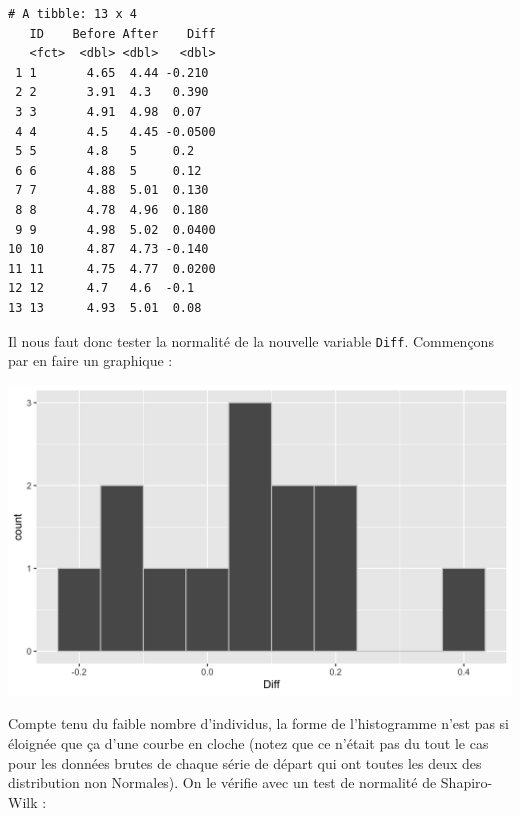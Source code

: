 \documentclass[a4paperpaper,]{article}
\newenvironment{Shaded}{\begin{snugshade}}{\end{snugshade}}
\newcommand{\DataTypeTok}[1]{\textcolor[rgb]{0.00,0.34,0.68}{#1}}
\newcommand{\DecValTok}[1]{\textcolor[rgb]{0.69,0.50,0.00}{#1}}
\newcommand{\FloatTok}[1]{\textcolor[rgb]{0.69,0.50,0.00}{#1}}
\newcommand{\KeywordTok}[1]{\textcolor[rgb]{0.12,0.11,0.11}{\textbf{#1}}}
\newcommand{\NormalTok}[1]{\textcolor[rgb]{0.12,0.11,0.11}{#1}}
\newcommand{\OperatorTok}[1]{\textcolor[rgb]{0.12,0.11,0.11}{#1}}
\newcommand{\StringTok}[1]{\textcolor[rgb]{0.75,0.01,0.01}{#1}}
\begin{document}
\begin{verbatim}
# A tibble: 13 x 4
   ID    Before After    Diff
   <fct>  <dbl> <dbl>   <dbl>
 1 1       4.65  4.44 -0.210 
 2 2       3.91  4.3   0.390 
 3 3       4.91  4.98  0.07  
 4 4       4.5   4.45 -0.0500
 5 5       4.8   5     0.2   
 6 6       4.88  5     0.12  
 7 7       4.88  5.01  0.130 
 8 8       4.78  4.96  0.180 
 9 9       4.98  5.02  0.0400
10 10      4.87  4.73 -0.140 
11 11      4.75  4.77  0.0200
12 12      4.7   4.6  -0.1   
13 13      4.93  5.01  0.08  
\end{verbatim}

Il nous faut donc tester la normalité de la nouvelle variable \texttt{Diff}. Commençons par en faire un graphique :

\begin{Shaded}
\end{Shaded}

\begin{center}\includegraphics[width=0.9\linewidth]{figure/unnamed-chunk-39-1} \end{center}

Compte tenu du faible nombre d'individus, la forme de l'histogramme n'est pas si éloignée que ça d'une courbe en cloche (notez que ce n'était pas du tout le cas pour les données brutes de chaque série de départ qui ont toutes les deux des distribution non Normales). On le vérifie avec un test de normalité de Shapiro-Wilk :
\end{document}

